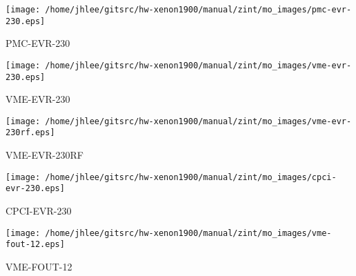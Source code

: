 \noindent
\vspace{1cm}
\begin{minipage}{.2\textwidth}
\begin{center}
\texttt{[image: /home/jhlee/gitsrc/hw-xenon1900/manual/zint/mo\_images/pmc-evr-230.eps]}
\end{center}
\end{minipage}
\begin{minipage}{.7\textwidth}
PMC-EVR-230
\end{minipage}


\noindent
\vspace{1cm}
\begin{minipage}{.2\textwidth}
\begin{center}
\texttt{[image: /home/jhlee/gitsrc/hw-xenon1900/manual/zint/mo\_images/vme-evr-230.eps]}
\end{center}
\end{minipage}
\begin{minipage}{.7\textwidth}
VME-EVR-230
\end{minipage}


\noindent
\vspace{1cm}
\begin{minipage}{.2\textwidth}
\begin{center}
\texttt{[image: /home/jhlee/gitsrc/hw-xenon1900/manual/zint/mo\_images/vme-evr-230rf.eps]}
\end{center}
\end{minipage}
\begin{minipage}{.7\textwidth}
VME-EVR-230RF
\end{minipage}


\noindent
\vspace{1cm}
\begin{minipage}{.2\textwidth}
\begin{center}
\texttt{[image: /home/jhlee/gitsrc/hw-xenon1900/manual/zint/mo\_images/cpci-evr-230.eps]}
\end{center}
\end{minipage}
\begin{minipage}{.7\textwidth}
CPCI-EVR-230
\end{minipage}


\noindent
\vspace{1cm}
\begin{minipage}{.2\textwidth}
\begin{center}
\texttt{[image: /home/jhlee/gitsrc/hw-xenon1900/manual/zint/mo\_images/vme-fout-12.eps]}
\end{center}
\end{minipage}
\begin{minipage}{.7\textwidth}
VME-FOUT-12
\end{minipage}


